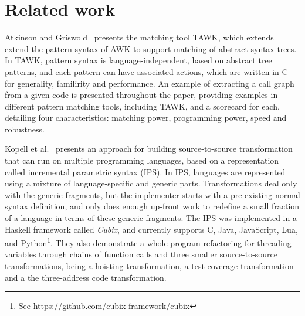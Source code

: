 \begin{example}
\end{example}

\section{Related work}\label{sec:related-work}

Atkinson and Griswold~\cite{atkinson2006-effective-pattern-matching} presents
the matching tool TAWK, which extends extend the pattern syntax of AWK to
support matching of abstract syntax trees. In TAWK, pattern syntax is
language-independent, based on abstract tree patterns, and each pattern can
have associated actions, which are written in C for generality, familirity
and performance. An example of extracting a call graph from a given code is
presented throughout the paper, providing examples in different pattern matching
tools, including TAWK, and a scorecard for each, detailing four characteristics:
matching power, programming power, speed and robustness.

Kopell et al.~\cite{kopell2018-language-parametric-transformation} presents an
approach for building source-to-source transformation that can run on multiple
programming languages, based on a representation called incremental parametric
syntax (IPS).
In IPS, languages are represented using a mixture of language-specific and
generic parts. Transformations deal only with the generic fragments, but
the implementer starts with a pre-existing normal syntax definition, and
only does enough up-front work to redefine a small fraction of a language
in terms of these generic fragments.
The IPS was implemented in a Haskell framework called \textit{Cubix},
and currently supports C, Java, JavaScript, Lua, and Python\footnote{
See \url{https://github.com/cubix-framework/cubix}}.
They also demonstrate a whole-program refactoring for threading variables
through chains of function calls and three smaller source-to-source
transformations, being a hoisting transformation, a test-coverage
transformation and a the three-address code transformation.

